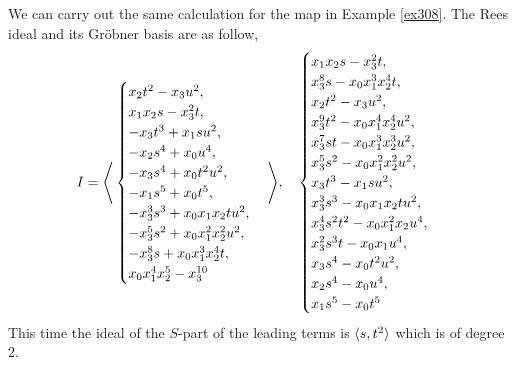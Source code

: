 \documentclass[fleqn,reqno]{amsart}
\numberwithin{first}{chapter}
\begin{document}
\begin{example}[$\mt{ex314}$]
We can carry out the same calculation for the map in Example \ref{ex308}.
The Rees ideal and its Gr\"obner basis are as follow,
\[
	I=\Bigg\langle\begin{cases}
	{x}_{2} t^{2}-{x}_{3} u^{2},\\{x}_{1} {x}_{2} s-{x}_{3}^{2} t,\\-{x}_{3}
	     t^{3}+{x}_{1} s u^{2},\\-{x}_{2} s^{4}+{x}_{0} u^{4},\\-{x}_{3} s^{4}+{x}_{0} t^{2}
	     u^{2},\\-{x}_{1} s^{5}+{x}_{0} t^{5},\\-{x}_{3}^{3} s^{3}+{x}_{0} {x}_{1} {x}_{2} t
	     u^{2},\\-{x}_{3}^{5} s^{2}+{x}_{0} {x}_{1}^{2} {x}_{2}^{2} u^{2},\\-{x}_{3}^{8}
	     s+{x}_{0} {x}_{1}^{3} {x}_{2}^{4} t,\\{x}_{0} {x}_{1}^{4}
	     {x}_{2}^{5}-{x}_{3}^{10}
	\end{cases}\Bigg\rangle,
	\quad
	\begin{cases}
		{x}_{1} {x}_{2} s-{x}_{3}^{2}
		      t,\\{x}_{3}^{8} s-{x}_{0} {x}_{1}^{3} {x}_{2}^{4} t,\\{x}_{2} t^{2}-{x}_{3}
		      u^{2},\\{x}_{3}^{9} t^{2}-{x}_{0} {x}_{1}^{4} {x}_{2}^{4} u^{2},\\{x}_{3}^{7} s
		      t-{x}_{0} {x}_{1}^{3} {x}_{2}^{3} u^{2},\\{x}_{3}^{5} s^{2}-{x}_{0} {x}_{1}^{2}
		      {x}_{2}^{2} u^{2},\\{x}_{3} t^{3}-{x}_{1} s u^{2},\\{x}_{3}^{3} s^{3}-{x}_{0}
		      {x}_{1} {x}_{2} t u^{2},\\{x}_{3}^{4} s^{2} t^{2}-{x}_{0} {x}_{1}^{2} {x}_{2}
		      u^{4},\\{x}_{3}^{2} s^{3} t-{x}_{0} {x}_{1} u^{4},\\{x}_{3} s^{4}-{x}_{0} t^{2}
		      u^{2},\\{x}_{2} s^{4}-{x}_{0} u^{4},\\{x}_{1} s^{5}-{x}_{0} t^{5}
	\end{cases}
\]
This time the ideal of the $S$-part of the leading terms is $\langle s,t^2\rangle$ which is of degree 2.
\end{example}
\end{document}
